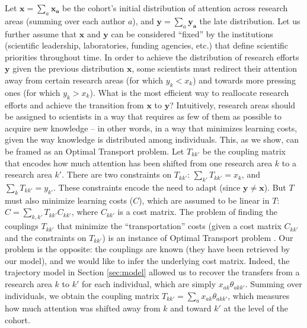 \documentclass{article}
\begin{document}
Let $\bm{x}=\sum_a \bm{x_a}$ be the cohort's initial distribution of attention across research areas (summing over each author $a$), and $\bm{y}=\sum_a \bm{y_a}$ the late distribution. Let us further assume that $\bm{x}$ and $\bm{y}$ can be considered ``fixed'' by the institutions (scientific leadership, laboratories, funding agencies, etc.) that define scientific priorities throughout time. In order to achieve the distribution of research efforts $\bm{y}$ given the previous distribution $\bm{x}$, some scientists must redirect their attention away from certain research areas (for which $y_k<x_k$) and towards more pressing ones (for which $y_k>x_k$). What is the most efficient way to reallocate research efforts and achieve the transition from $\bm{x}$ to $\bm{y}$? Intuitively, research areas should be assigned to scientists in a way that requires as few of them as possible to acquire new knowledge -- in other words, in a way that minimizes learning costs, given the way knowledge is distributed among individuals. This, as we show, can be framed as an Optimal Transport problem. Let $T_{kk'}$ be the coupling matrix that encodes how much attention has been shifted from one research area $k$ to a research area $k'$. There are two constraints on $T_{kk'}$: $\sum_{k'} T_{kk'} = x_k$, and $\sum_{k} T_{kk'} = y_{k'}$. These constraints encode the need to adapt (since $\bm{y}\neq \bm{x}$). But $T$ must also minimize learning costs ($C$), which are assumed to be linear in $T$: $C=\sum_{k,k'}T_{kk'}C_{kk'}$, where $C_{kk'}$ is a cost matrix. The problem of finding the couplings $T_{kk'}$ that minimize the ``transportation'' costs (given a cost matrix $C_{kk'}$ and the constraints on $T_{kk'}$) is an instance of Optimal Transport problem \citep{Peyre2018}. Our problem is the opposite: the couplings are known (they have been retrieved by our model), and we would like to infer the underlying cost matrix. Indeed, the trajectory model in Section \ref{sec:model} allowed us to recover the transfers from a research area $k$ to $k'$ for each individual, which are simply $x_{ak}\theta_{akk'}$. Summing over individuals, we obtain the coupling matrix $T_{kk'}=\sum_a x_{ak} \theta_{akk'}$, which measures how much attention was shifted away from $k$ and toward $k'$ at the level of the cohort.
\end{document}
